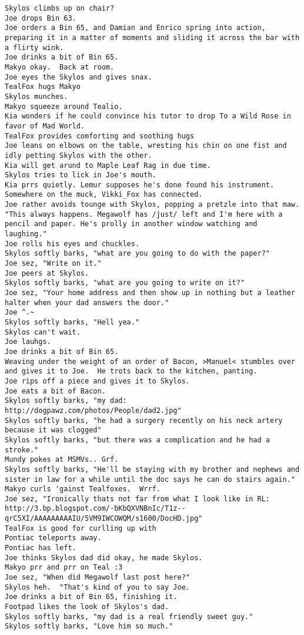 \begin{verbatim}
Skylos climbs up on chair?
Joe drops Bin 63.
Joe orders a Bin 65, and Damian and Enrico spring into action, preparing it in a matter of moments and sliding it across the bar with a flirty wink.
Joe drinks a bit of Bin 65.
Makyo okay.  Back at room.
Joe eyes the Skylos and gives snax.
TealFox hugs Makyo
Skylos munches.
Makyo squeeze around Tealio.
Kia wonders if he could convince his tutor to drop To a Wild Rose in favor of Mad World.
TealFox provides comforting and soothing hugs
Joe leans on elbows on the table, wresting his chin on one fist and idly petting Skylos with the other.
Kia will get arund to Maple Leaf Rag in due time.
Skylos tries to lick in Joe's mouth.
Kia prrs quietly. Lemur supposes he's done found his instrument.
Somewhere on the muck, Vikki_Fox has connected.
Joe rather avoids tounge with Skylos, popping a pretzle into that maw. "This always happens. Megawolf has /just/ left and I'm here with a pencil and paper. He's prolly in another window watching and laughing."
Joe rolls his eyes and chuckles.
Skylos softly barks, "what are you going to do with the paper?"
Joe sez, "Write on it."
Joe peers at Skylos.
Skylos softly barks, "what are you going to write on it?"
Joe sez, "Your home address and then show up in nothing but a leather halter when your dad answers the door."
Joe ^.~
Skylos softly barks, "Hell yea."
Skylos can't wait.
Joe lauhgs.
Joe drinks a bit of Bin 65.
Weaving under the weight of an order of Bacon, >Manuel< stumbles over and gives it to Joe.  He trots back to the kitchen, panting.
Joe rips off a piece and gives it to Skylos.
Joe eats a bit of Bacon.
Skylos softly barks, "my dad: http://dogpawz.com/photos/People/dad2.jpg"
Skylos softly barks, "he had a surgery recently on his neck artery because it was clogged"
Skylos softly barks, "but there was a complication and he had a stroke."
Mundy pokes at MSMVs.. Grf.
Skylos softly barks, "He'll be staying with my brother and nephews and sister in law for a while until the doc says he can do stairs again."
Makyo curls 'gainst Tealfoxes.  Wrrf.
Joe sez, "Ironically thats not far from what I look like in RL: http://3.bp.blogspot.com/-bKbQXVNBnIc/T1z--qrC5XI/AAAAAAAAAIU/5VM9IWCOWQM/s1600/DocHD.jpg"
TealFox is good for curlling up with
Pontiac teleports away.
Pontiac has left.
Joe thinks Skylos dad did okay, he made Skylos.
Makyo prr and prr on Teal :3
Joe sez, "When did Megawolf last post here?"
Skylos heh.  "That's kind of you to say Joe.
Joe drinks a bit of Bin 65, finishing it.
Footpad likes the look of Skylos's dad.
Skylos softly barks, "my dad is a real friendly sweet guy."
Skylos softly barks, "Love him so much."

\end{verbatim}
